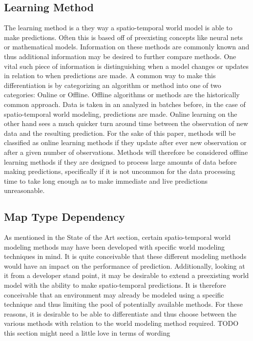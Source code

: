  \subsection{ Learning Method }
  The learning method is a they way a spatio-temporal world model is able to
  make predictions. Often this is based off of preexisting concepts like neural
  nets or mathematical models. Information on these methods are commonly known
  and thus additional information may be desired to further compare methods.
  One vital such piece of information is distinguishing when a model
  changes or updates in relation to when predictions are made. A common way to
  make this differentiation is by categorizing an algorithm or method into one of
  two categories: Online or Offline. Offline algorithms or methods are the
  historically common approach. Data is taken in an analyzed in batches before,
  in the case of spatio-temporal world modeling, predictions are made. Online
  learning on the other hand sees a much quicker turn around time between the
  observation of new data and the resulting prediction. \cite{Karp1992} For the sake of this
  paper, methods will be classified as online learning methods if they update
  after ever new observation or after a given number of observations. Methods
  will therefore be considered offline learning methods if they are designed to
  process large amounts of data before making predictions, specifically if it
  is not uncommon for the data processing time to take long enough as to make
  immediate and live predictions unreasonable.

  \subsection{ Map Type Dependency }
  As mentioned in the State of the Art section, certain spatio-temporal world
  modeling methods may have been developed with specific world modeling techniques in
  mind. It is quite conceivable that these different modeling methods would
  have an impact on the performance of prediction. Additionally, looking at it
  from a developer stand point, it may be desirable to extend a preexisting
  world model with the ability to make spatio-temporal predictions. It is
  therefore conceivable that an environment may already be modeled using a
  specific technique and thus limiting the pool of potentially available methods.
  For these reasons, it is desirable to be able to differentiate and thus choose
  between the various methods with relation to the world modeling method
  required. TODO this section might need a little love in terms of wording



